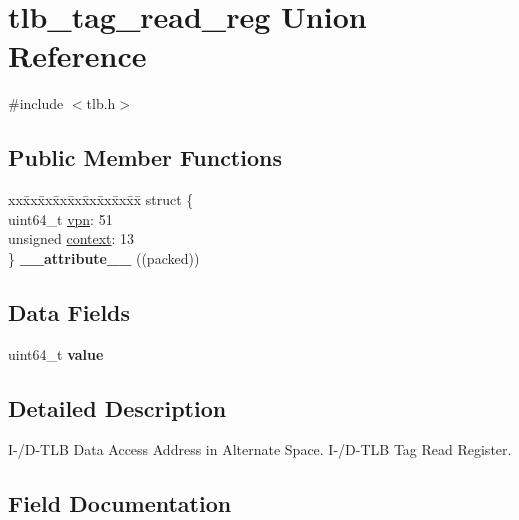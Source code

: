 \hypertarget{uniontlb__tag__read__reg}{}\section{tlb\+\_\+tag\+\_\+read\+\_\+reg Union Reference}
\label{uniontlb__tag__read__reg}


{\ttfamily \#include $<$tlb.\+h$>$}

\subsection*{Public Member Functions}
\begin{DoxyCompactItemize}
\item 
\mbox{\label{uniontlb__tag__read__reg_aeab6da2084944cd9aa0fcb2b246081da}} 
\begin{tabbing}
xx\=xx\=xx\=xx\=xx\=xx\=xx\=xx\=xx\=\kill
struct \{\\
\>uint64\_t \mbox{\hyperlink{uniontlb__tag__read__reg_a4af73c3f0e6d28c433b8ee3c408ec79a}{vpn}}: 51\\
\>unsigned \mbox{\hyperlink{uniontlb__tag__read__reg_aceee4c0a82611563d83c9def061f4466}{context}}: 13\\
\} {\bfseries \_\_attribute\_\_} ((packed))\\

\end{tabbing}\end{DoxyCompactItemize}
\subsection*{Data Fields}
\begin{DoxyCompactItemize}
\item 
\mbox{\label{uniontlb__tag__read__reg_acc9ee80d4e6a909d15f5b02fd12e226a}} 
uint64\+\_\+t {\bfseries value}
\end{DoxyCompactItemize}


\subsection{Detailed Description}
I-\//\+D-\/\+T\+LB Data Access Address in Alternate Space. I-\//\+D-\/\+T\+LB Tag Read Register. 

\subsection{Field Documentation}
\mbox{\label{uniontlb__tag__read__reg_aceee4c0a82611563d83c9def061f4466}} 
